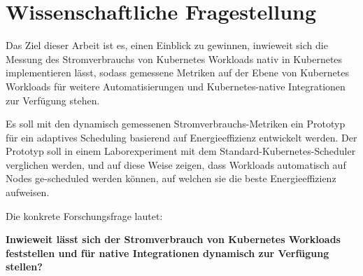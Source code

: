 \chapter{Wissenschaftliche Fragestellung}

Das Ziel dieser Arbeit ist es, einen Einblick zu gewinnen, 
inwieweit sich die Messung des Stromverbrauchs von Kubernetes Workloads 
nativ in Kubernetes implementieren lässt,
sodass gemessene Metriken auf der Ebene von Kubernetes Workloads 
für weitere Automatisierungen und
Kubernetes-native Integrationen zur Verfügung stehen.
\bigskip

Es soll mit den dynamisch gemessenen Stromverbrauchs-Metriken
ein Prototyp für ein adaptives Scheduling basierend auf Energieeffizienz entwickelt werden.
Der Prototyp soll in einem Laborexperiment mit dem Standard-Kubernetes-Scheduler verglichen werden,
und auf diese Weise zeigen, dass Workloads automatisch auf Nodes ge-scheduled werden können,
auf welchen sie die beste Energieeffizienz aufweisen.
\bigskip

Die konkrete Forschungsfrage lautet:
\bigskip

\textbf{Inwieweit lässt sich der Stromverbrauch von Kubernetes Workloads feststellen
und für native Integrationen dynamisch zur Verfügung stellen?}
\bigskip



